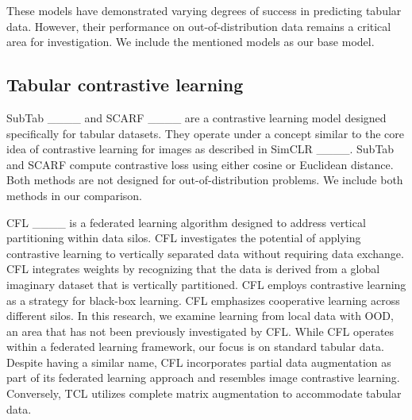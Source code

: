 These models have demonstrated varying degrees of success in predicting tabular data. However, their performance on out-of-distribution data remains a critical area for investigation. We include the mentioned models as our base model.

\subsection{Tabular contrastive learning}
    SubTab ____ and SCARF ____ are a contrastive learning model designed specifically for tabular datasets. They operate under a concept similar to the core idea of contrastive learning for images as described in SimCLR ____. SubTab and SCARF compute contrastive loss using either cosine or Euclidean distance. Both methods are not designed for out-of-distribution problems. We include both methods in our comparison.
    
    CFL ____ is a federated learning algorithm designed to address vertical partitioning within data silos. CFL investigates the potential of applying contrastive learning to vertically separated data without requiring data exchange. CFL integrates weights by recognizing that the data is derived from a global imaginary dataset that is vertically partitioned. CFL employs contrastive learning as a strategy for black-box learning. CFL emphasizes cooperative learning across different silos. In this research, we examine learning from local data with OOD, an area that has not been previously investigated by CFL. While CFL operates within a federated learning framework, our focus is on standard tabular data. Despite having a similar name, CFL incorporates partial data augmentation as part of its federated learning approach and resembles image contrastive learning. Conversely, TCL utilizes complete matrix augmentation to accommodate tabular data.
%